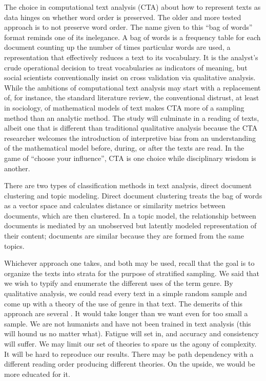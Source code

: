 \documentclass[]{book}
\theoremstyle{definition}
\theoremstyle{definition}
\theoremstyle{definition}
\theoremstyle{remark}
\begin{document}
The choice in computational text analysis (CTA) about how to represent
texts as data hinges on whether word order is preserved. The older and
more tested approach is to not preserve word order. The name given to
this ``bag of words'' format reminds one of its inelegance. A bag of
words is a frequency table for each document counting up the number of
times particular words are used, a representation that effectively
reduces a text to its vocabulary. It is the analyst's crude operational
decision to treat vocabularies as indicators of meaning, but social
scientists conventionally insist on cross validation via qualitative
analysis. While the ambitions of computational text analysis may start
with a replacement of, for instance, the standard literature review, the
conventional distrust, at least in sociology, of mathematical models of
text makes CTA more of a sampling method than an analytic method. The
study will culminate in a reading of texts, albeit one that is different
than traditional qualitative analysis because the CTA researcher
welcomes the introduction of interpretive bias from an understanding of
the mathematical model before, during, or after the texts are read. In
the game of ``choose your influence'', CTA is one choice while
disciplinary wisdom is another.

There are two types of classification methods in text analysis, direct
document clustering and topic modeling. Direct document clustering
treats the bag of words as a vector space and calculates distance or
similarity metrics between documents, which are then clustered. In a
topic model, the relationship between documents is mediated by an
unobserved but latently modeled representation of their content;
documents are similar because they are formed from the same topics.

Whichever approach one takes, and both may be used, recall that the goal
is to organize the texts into strata for the purpose of stratified
sampling. We said that we wish to typify and enumerate the different
uses of the term genre. By qualitative analysis, we could read every
text in a simple random sample and come up with a theory of the use of
genre in that text. The demerits of this approach are several
\citep[c.f.][5]{Nelson2017Computational}. It would take longer than we
want even for too small a sample. We are not humanists and have not been
trained in text analysis (this will hound us no matter what). Fatigue
will set in, and accuracy and consistency will suffer. We may limit our
set of theories to spare us the agony of complexity. It will be hard to
reproduce our results. There may be path dependency with a different
reading order producing different theories. On the upside, we would be
more educated for it.
\end{document}
